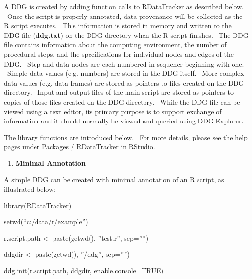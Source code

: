 \documentclass[letterpaper]{article}
\newcounter{saveenum}
\newcommand\liststyleWWNumxv{%
\renewcommand\theenumi{\arabic{enumi}}
\renewcommand\theenumii{\alph{enumii}}
\renewcommand\theenumiii{\alph{enumii}.\roman{enumiii}}
\renewcommand\theenumiv{\alph{enumii}.\roman{enumiii}.\arabic{enumiv}}
\renewcommand\labelenumi{\theenumi.}
\renewcommand\labelenumii{\theenumii.}
\renewcommand\labelenumiii{\theenumiii.}
\renewcommand\labelenumiv{\theenumiv.}
}
\begin{document}
\bigskip

A DDG is created by adding function calls to RDataTracker as described below. \ Once the script is properly annotated, data provenance will be collected as the R script executes. \ This information is stored in memory and written to the DDG file (\textbf{ddg.txt}) on the DDG directory when the R script finishes. \ The DDG file contains information about the computing environment, the number of procedural steps, and the specifications for individual nodes and edges of the DDG. \ Step and data nodes are each numbered in sequence beginning with one. \ Simple data values (e.g. numbers) are stored in the DDG itself. \ More complex data values (e.g. data frames) are stored as pointers to files created on the DDG directory. \ Input and output files of the main script are stored as pointers to copies of those files created on the DDG directory. \ While the DDG file can be viewed using a text editor, its primary purpose is to support exchange of information and it should normally be viewed and queried using DDG Explorer.


\bigskip

The library functions are introduced below. \ For more details, please see the help pages under Packages / RDataTracker in RStudio.


\bigskip

\liststyleWWNumxv
\setcounter{saveenum}{\value{enumi}}
\begin{enumerate}
\setcounter{enumi}{\value{saveenum}}
\item \textbf{Minimal Annotation}
\end{enumerate}

\bigskip

A simple DDG can be created with minimal annotation of an R script, as illustrated below:


\bigskip

\textcolor[rgb]{0.21176471,0.37254903,0.5686275}{library(RDataTracker)}

\textcolor[rgb]{0.21176471,0.37254903,0.5686275}{setwd(``c:/data/r/example'')}

\textcolor[rgb]{0.21176471,0.37254903,0.5686275}{r.script.path {\textless}- paste(getwd(), ''test.r'', sep=''{}'')}

\textcolor[rgb]{0.21176471,0.37254903,0.5686275}{ddgdir {\textless}- paste(getwd(), ''/ddg'', sep=''{}'')}

\textcolor[rgb]{0.21176471,0.37254903,0.5686275}{ddg.init(r.script.path, ddgdir, enable.console=TRUE)}
\end{document}
